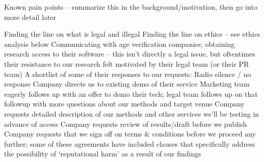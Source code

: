 \begin{outline}
\1 Known pain points -- summarize this in the background/motivation, then go into more detail later

\1 Finding the line on what is legal and illegal
\1 Finding the line on ethics – see ethics analysis below
\1 Communicating with age verification companies; obtaining research access to their software – this isn’t directly a legal issue, but oftentimes their resistance to our research felt motivated by their legal team (or their PR team)
\2 A shortlist of some of their responses to our requests:
\3 Radio silence / no response
\3 Company directs us to existing demo of their service
\3 Marketing team eagerly follows up with an offer to demo their tech; legal team follows up on that followup with more questions about our methods and target venue
\3 Company requests detailed description of our methods and other services we’ll be testing in advance of access
\3 Company requests review of results/draft before we publish
\3 Company requests that we sign off on terms \& conditions before we proceed any further; some of these agreements have included clauses that specifically address the possibility of `reputational harm’ as a result of our findings
\end{outline}



